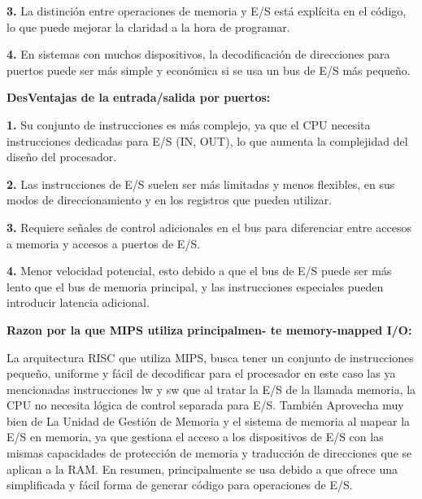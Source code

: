 \documentclass{article}
\begin{document}
\quad

\textbf{3.   }{La distinción entre operaciones de memoria y E/S está explícita en el código, lo que puede mejorar la claridad a la hora de programar.}

\quad

\textbf{4.   }{En sistemas con muchos dispositivos, la decodificación de direcciones para puertos puede ser más simple y económica si se usa un bus de E/S más pequeño.}

\quad

\textbf{DesVentajas de la entrada/salida por puertos:}

\quad

\textbf{1.   }{Su conjunto de instrucciones es más complejo, ya que el CPU necesita instrucciones dedicadas para E/S (IN, OUT), lo que aumenta la complejidad del diseño del procesador.}

\quad

\textbf{2.   }{Las instrucciones de E/S suelen ser más limitadas y menos flexibles, en sus modos de direccionamiento y en los registros que pueden utilizar.}

\quad

\textbf{3.   }{Requiere señales de control adicionales en el bus para diferenciar entre accesos a memoria y accesos a puertos de E/S.}

\quad

\textbf{4.   }{Menor velocidad potencial, esto debido a que el bus de E/S puede ser más lento que el bus de memoria principal, y las instrucciones especiales pueden introducir latencia adicional.}

\quad

\textbf{Razon por la que MIPS utiliza principalmen-
te memory-mapped I/O:}

\quad

{La arquitectura RISC que utiliza MIPS, busca tener un conjunto de instrucciones pequeño, uniforme y fácil de decodificar para el procesador en este caso las ya mencionadas instrucciones lw y sw que al tratar la E/S de la llamada memoria, la CPU no necesita lógica de control separada para E/S. También Aprovecha muy bien de La Unidad de Gestión de Memoria y el sistema de memoria al mapear la E/S en memoria, ya que gestiona el acceso a los dispositivos de E/S con las mismas capacidades de protección de memoria y traducción de direcciones que se aplican a la RAM. En resumen, principalmente se usa debido a que ofrece una simplificada y fácil forma de generar código para operaciones de E/S.}
\end{document}
